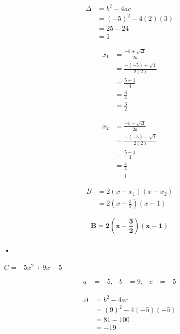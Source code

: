 \documentclass[12pt,a4paper]{article}
\begin{document}
\begin{enumerate}
\[
\begin{aligned}
\Delta &= b^2 - 4ac \\
       &= (-5)^2 - 4(2)(3) \\
       &= 25 - 24 \\
       &= 1
\end{aligned}
\]

\[
\begin{aligned}
x_1 &= \frac{-b + \sqrt{\Delta}}{2a} \\
    &= \frac{-(-5) + \sqrt{1}}{2(2)} \\
    &= \frac{5 + 1}{4} \\
    &= \frac{6}{4} \\
    &= \frac{3}{2}
\end{aligned}
\]

\[
\begin{aligned}
x_2 &= \frac{-b - \sqrt{\Delta}}{2a} \\
    &= \frac{-(-5) - \sqrt{1}}{2(2)} \\
    &= \frac{5 - 1}{4} \\
    &= \frac{4}{4} \\
    &= 1
\end{aligned}
\]

\[
\begin{aligned}
B &= 2(x - x_1)(x - x_2) \\
  &= 2 \left( x - \frac{3}{2} \right) (x - 1)
\end{aligned}
\]

\begin{tcolorbox}[colback=yellow!20, colframe=black, sharp corners]
    \[
    \mathbf{B = 2 \left( x - \frac{3}{2} \right) (x - 1)}
    \]
\end{tcolorbox}

\paragraph{•}
\(
C = -5x^2 + 9x - 5
\)

\[
\begin{aligned}
a &= -5, & b &= 9, & c &= -5
\end{aligned}
\]

\[
\begin{aligned}
\Delta &= b^2 - 4ac \\
       &= (9)^2 - 4(-5)(-5) \\
       &= 81 - 100 \\
       &= -19
\end{aligned}
\]


\end{enumerate}
\end{document}
